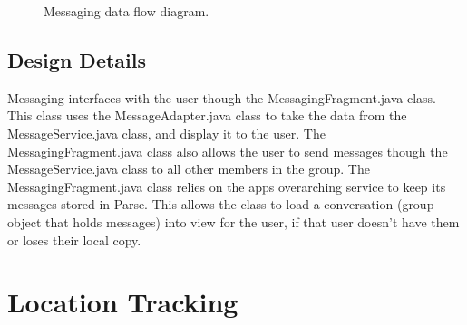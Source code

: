 	\begin{figure}[tbh!]
	\begin{center}
	\end{center}
	\caption{Messaging data flow diagram. \label{MessagingDataFlow}}
	\end{figure}

\subsection{Design Details}
Messaging interfaces with the user though the MessagingFragment.java class. This class uses the MessageAdapter.java class to take the data from the MessageService.java class, and display it to the user. The MessagingFragment.java class also allows the user to send messages though the MessageService.java class to all other members in the group.
The MessagingFragment.java class relies on the apps overarching service to keep its messages stored in Parse. This allows the class to load a conversation (group object that holds messages) into view for the user, if that user doesn't have them or loses their local copy.

\section{Location Tracking }

